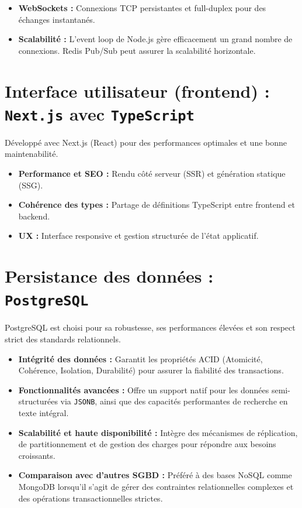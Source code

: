 \documentclass{rapportPfe}
\begin{document}
\begin{itemize}
    \item \textbf{WebSockets :} Connexions TCP persistantes et full-duplex pour des échanges instantanés.
    \item \textbf{Scalabilité :} L’event loop de Node.js gère efficacement un grand nombre de connexions. Redis Pub/Sub peut assurer la scalabilité horizontale.
\end{itemize}

\section{Interface utilisateur (frontend) : \texttt{Next.js} avec \texttt{TypeScript}}

Développé avec Next.js (React) pour des performances optimales et une bonne maintenabilité.

\begin{itemize}
    \item \textbf{Performance et SEO :} Rendu côté serveur (SSR) et génération statique (SSG).
    \item \textbf{Cohérence des types :} Partage de définitions TypeScript entre frontend et backend.
    \item \textbf{UX :} Interface responsive et gestion structurée de l’état applicatif.
\end{itemize}

\section{Persistance des données : \texttt{PostgreSQL}}

PostgreSQL est choisi pour sa robustesse, ses performances élevées et son respect strict des standards relationnels.

\begin{itemize}
    \item \textbf{Intégrité des données :} Garantit les propriétés ACID (Atomicité, Cohérence, Isolation, Durabilité) pour assurer la fiabilité des transactions.
    \item \textbf{Fonctionnalités avancées :} Offre un support natif pour les données semi-structurées via \texttt{JSONB}, ainsi que des capacités performantes de recherche en texte intégral.
    \item \textbf{Scalabilité et haute disponibilité :} Intègre des mécanismes de réplication, de partitionnement et de gestion des charges pour répondre aux besoins croissants.
    \item \textbf{Comparaison avec d’autres SGBD :} Préféré à des bases NoSQL comme MongoDB lorsqu’il s’agit de gérer des contraintes relationnelles complexes et des opérations transactionnelles strictes.
\end{itemize}
\end{document}
